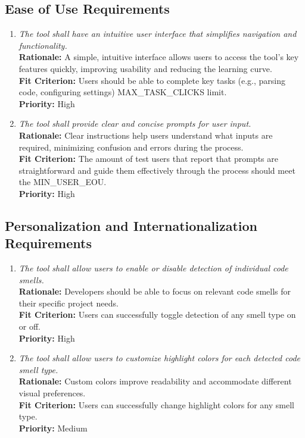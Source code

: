 \documentclass[12pt]{article}
\begin{document}
\subsection{Ease of Use Requirements}
\begin{enumerate}[label=UHR-EOU \arabic*., wide=0pt, leftmargin=*]
  \item \emph{The tool shall have an intuitive user interface that
    simplifies navigation and functionality.}\\[2mm]
    {\bf Rationale:} A simple, intuitive interface allows users to
    access the tool's key features quickly, improving usability and
    reducing the learning curve.\\
    {\bf Fit Criterion:} Users should be able to complete key tasks
    (e.g., parsing code, configuring settings) MAX\_TASK\_CLICKS limit.\\
    {\bf Priority:} High
  \item \emph{The tool shall provide clear and concise prompts for
    user input.}\\[2mm]
    {\bf Rationale:} Clear instructions help users understand what
    inputs are required, minimizing confusion and errors during the process.\\
    {\bf Fit Criterion:} The amount of test users that report that
    prompts are straightforward and guide them effectively through
    the process should meet the MIN\_USER\_EOU.\\
    {\bf Priority:} High
\end{enumerate}

\subsection{Personalization and Internationalization Requirements}
\begin{enumerate}[label=UHR-PSI \arabic*., wide=0pt, leftmargin=*]
  \item \emph{The tool shall allow users to enable or disable detection of individual code smells.}
  \\[2mm]
  {\bf Rationale:} Developers should be able to focus on relevant code smells for their specific project needs.\\
  {\bf Fit Criterion:} Users can successfully toggle detection of any smell type on or off.\\
  {\bf Priority:} High
  
  \item \emph{The tool shall allow users to customize highlight colors for each detected code smell type.}
  \\[2mm]
  {\bf Rationale:} Custom colors improve readability and accommodate different visual preferences.\\
  {\bf Fit Criterion:} Users can successfully change highlight colors for any smell type.\\
  {\bf Priority:} Medium
\end{enumerate}
\end{document}
